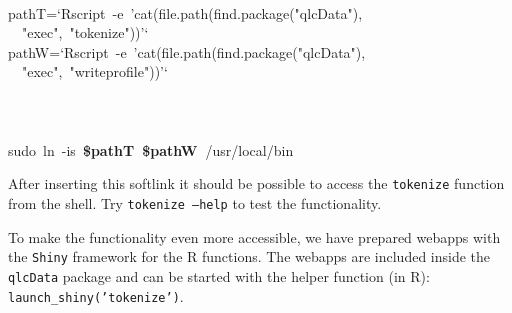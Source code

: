 \documentclass[output=book,nonflat,modfonts,
citecolor=brown,
		]{langsci/langscibook}\usepackage[]{graphicx}\usepackage[]{color}
\makeatletter
\newcommand{\hlstr}[1]{\textcolor[rgb]{0.192,0.494,0.8}{#1}}%
\newcommand{\hlopt}[1]{\textcolor[rgb]{0,0,0}{#1}}%
\newcommand{\hlstd}[1]{\textcolor[rgb]{0.345,0.345,0.345}{#1}}%
\newcommand{\hlkwb}[1]{\textcolor[rgb]{0.69,0.353,0.396}{#1}}%
\newcommand{\hlkwc}[1]{\textcolor[rgb]{0.333,0.667,0.333}{#1}}%
\newcommand{\hlkwd}[1]{\textcolor[rgb]{0.737,0.353,0.396}{\textbf{#1}}}%
\newenvironment{kframe}{%
 \def\at@end@of@kframe{}%
 \ifinner\ifhmode%
  \def\at@end@of@kframe{\end{minipage}}%
  \begin{minipage}{\columnwidth}%
 \fi\fi%
 \def\FrameCommand##1{\hskip\@totalleftmargin \hskip-\fboxsep
 \colorbox{shadecolor}{##1}\hskip-\fboxsep
     \hskip-\linewidth \hskip-\@totalleftmargin \hskip\columnwidth}%
 \MakeFramed {\advance\hsize-\width
   \@totalleftmargin\z@ \linewidth\hsize
   \@setminipage}}%
 {\par\unskip\endMakeFramed%
 \at@end@of@kframe}
\newenvironment{knitrout}{}{} %
\makeatother
\begin{document}
\begin{knitrout}\footnotesize
{}\color{fgcolor}\begin{kframe}
\noindent
\ttfamily
\hlstd{}\hspace*{\fill}\\
\hlstd{pathT}\hlopt{=}\hlstd{}\hlstr{`Rscript\ {-}e\ 'cat(file.path(find.package("qlcData"),\ }\hspace*{\fill}\\
\hlstr{}\hlstd{\ \ }\hlstr{"exec",\ "tokenize"))'`}\hlstd{}\hspace*{\fill}\\
\hlstd{pathW}\hlopt{=}\hlstd{}\hlstr{`Rscript\ {-}e\ 'cat(file.path(find.package("qlcData"),\ }\hspace*{\fill}\\
\hlstr{}\hlstd{\ \ }\hlstr{"exec",\ "writeprofile"))'`}\hlstd{}\hspace*{\fill}\\
\hlstd{}\hspace*{\fill}\\
\hlstd{}\hspace*{\fill}\\
\hlstd{}\hspace*{\fill}\\
\hlstd{sudo\ }\hlkwc{ln\ }\hlstd{}\hlkwb{{-}is\ }\hlstd{}\hlkwd{\$pathT\ \$pathW\ }\hlstd{}\hlopt{/}\hlstd{usr}\hlopt{/}\hlstd{local}\hlopt{/}\hlstd{bin}\hspace*{\fill}
\mbox{}
\normalfont
\end{kframe}
\end{knitrout}

After inserting this softlink it should be possible to access the
\texttt{tokenize} function from the shell. Try \texttt{tokenize --help} to test
the functionality.



To make the functionality even more accessible, we have prepared webapps with 
the \texttt{Shiny} framework for the R functions. The webapps are 
included inside the \texttt{qlcData} package and can be started with the 
helper function (in R): \texttt{launch\_shiny('tokenize')}.
\end{document}
